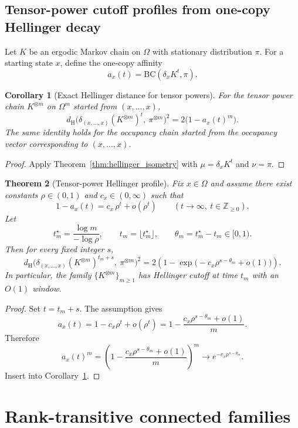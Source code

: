 \documentclass[final,3p,times]{elsarticle}
\newtheorem{theorem}{Theorem}[section]
\newtheorem{corollary}[theorem]{Corollary}
\theoremstyle{definition}
\newcommand{\HH}{d_{\mathrm{H}}}
\newcommand{\BC}{\mathrm{BC}}
\begin{document}
\subsection{Tensor-power cutoff profiles from one-copy Hellinger decay}

Let $K$ be an ergodic Markov chain on $\Omega$ with stationary distribution $\pi$.
For a starting state $x$, define the one-copy affinity
\[
a_x(t)=\BC(\delta_x K^t,\pi).
\]

\begin{corollary}[Exact Hellinger distance for tensor powers]\label{cor:exact_hellinger_tensor}
For the tensor power chain $K^{\otimes m}$ on $\Omega^m$ started from $(x,\dots,x)$,
\[
\HH\bigl(\delta_{(x,\dots,x)} (K^{\otimes m})^t,\ \pi^{\otimes m}\bigr)^2
=
2\bigl(1-a_x(t)^m\bigr).
\]
The same identity holds for the occupancy chain started from the occupancy vector corresponding to $(x,\dots,x)$.
\end{corollary}

\begin{proof}
Apply Theorem~\ref{thm:hellinger_isometry} with $\mu=\delta_x K^t$ and $\nu=\pi$.
\end{proof}

\begin{theorem}[Tensor-power Hellinger profile]\label{thm:tensor_power_profile}
Fix $x\in\Omega$ and assume there exist constants $\rho\in(0,1)$ and $c_x\in(0,\infty)$ such that
\[
1-a_x(t)=c_x\,\rho^t+o(\rho^t)\qquad (t\to\infty,\ t\in\mathbb{Z}_{\ge 0}).
\]
Let
\[
t_m^\star = \frac{\log m}{-\log\rho},
\qquad
t_m=\lfloor t_m^\star\rfloor,
\qquad
\theta_m=t_m^\star-t_m\in[0,1).
\]
Then for every fixed integer $s$,
\[
\HH\bigl(\delta_{(x,\dots,x)} (K^{\otimes m})^{t_m+s},\ \pi^{\otimes m}\bigr)^2
=
2\left(1-\exp\bigl(-c_x\rho^{s-\theta_m}+o(1)\bigr)\right).
\]
In particular, the family $\{K^{\otimes m}\}_{m\ge 1}$ has Hellinger cutoff at time $t_m$ with an $O(1)$ window.
\end{theorem}

\begin{proof}
Set $t=t_m+s$.
The assumption gives
\[
a_x(t)=1-c_x\rho^{t}+o(\rho^{t})
=1-\frac{c_x\rho^{s-\theta_m}+o(1)}{m}.
\]
Therefore
\[
a_x(t)^m=\left(1-\frac{c_x\rho^{s-\theta_m}+o(1)}{m}\right)^m\to e^{-c_x\rho^{s-\theta_m}}.
\]
Insert into Corollary~\ref{cor:exact_hellinger_tensor}.
\end{proof}

\section{Rank-transitive connected families}
\end{document}
